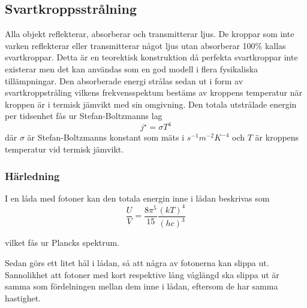 \subsection{Svartkroppsstrålning}

Alla objekt reflekterar, absorberar och transmitterar ljus. De kroppar som inte varken reflekterar eller transmitterar något ljus utan absorberar 100\% kallas svartkroppar. Detta är en teorektisk konstruktion då perfekta svartkroppar inte existerar men det kan användas som en god modell i flera fysikaliska tillämpningar. Den absorberade energi strålas sedan ut i form av svartkroppstråling vilkens frekvensspektum bestäms av kroppens temperatur när kroppen är i termisk jämvikt med sin omgivning. Den totala utstrålade energin per tidsenhet fås ur Stefan-Boltzmanns lag
\begin{equation}
j^{\star} = \sigma T^{4}
\end{equation}
\noindent
där $\sigma$ är Stefan-Boltzmanns konstant som mäts i $\unit{s^{-1}m^{-2}K^{-4}}$ och $T$ är kroppens temperatur vid termisk jämvikt.

\subsubsection{Härledning}
I en låda med fotoner kan den totala energin inne i lådan beskrivas som 
\begin{equation}
\frac{U}{V}=\frac{8\pi^5}{15}\frac{(kT)^4}{(hc)^3}
\end{equation}

vilket fås ur Plancks spektrum.\cite{schroeder00}

Sedan görs ett litet hål i lådan, så att några av fotonerna kan slippa ut. Sannolikhet att fotoner med kort respektive lång våglängd ska slippa ut är samma som fördelningen mellan dem inne i lådan, eftersom de har samma hastighet.

